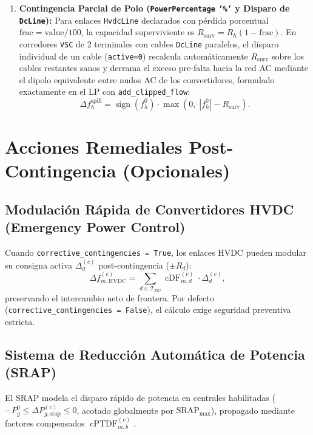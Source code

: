 \documentclass[11pt,a4paper]{article}
\begin{document}
\begin{enumerate}
    \item \textbf{Contingencia Parcial de Polo (\texttt{PowerPercentage} \texttt{'\%'} y Disparo de \texttt{DcLine}):} Para enlaces \texttt{HvdcLine} declarados con pérdida porcentual $\text{frac} = \text{value}/100$, la capacidad superviviente es $R_{\text{surv}} = R_h (1 - \text{frac})$. En corredores \texttt{VSC} de 2 terminales con cables \texttt{DcLine} paralelos, el disparo individual de un cable (\texttt{active=0}) recalcula automáticamente $R_{\text{surv}}$ sobre los cables restantes sanos y derrama el exceso pre-falta hacia la red AC mediante el dipolo equivalente entre nudos AC de los convertidores, formulado exactamente en el LP con \texttt{add\_clipped\_flow}:
    \begin{equation}
    \Delta f_h^{\text{spill}} = \operatorname{sign}(f_h^0) \cdot \max\left(0,\; |f_h^0| - R_{\text{surv}}\right).
    \end{equation}
\end{enumerate}

\section{Acciones Remediales Post-Contingencia (Opcionales)}

\subsection{Modulación Rápida de Convertidores HVDC (Emergency Power Control)}
Cuando \texttt{corrective\_contingencies = True}, los enlaces HVDC pueden modular su consigna activa $\Delta_d^{(c)}$ post-contingencia ($\pm R_d$):
\begin{equation}
\Delta f_{m, \text{HVDC}}^{(c)} = \sum_{d \in \mathcal{T}_{\text{DC}}} \operatorname{cDF}_{m, d}^{(c)} \cdot \Delta_d^{(c)},
\end{equation}
preservando el intercambio neto de frontera. Por defecto (\texttt{corrective\_contingencies = False}), el cálculo exige seguridad preventiva estricta.

\subsection{Sistema de Reducción Automática de Potencia (SRAP)}
El SRAP modela el disparo rápido de potencia en centrales habilitadas ($-P_g^0 \le \Delta P_{g,\text{srap}}^{(c)} \le 0$, acotado globalmente por $\text{SRAP}_{\max}$), propagado mediante factores compensados $\operatorname{cPTDF}_{m,b}^{(c)}$.
\end{document}
